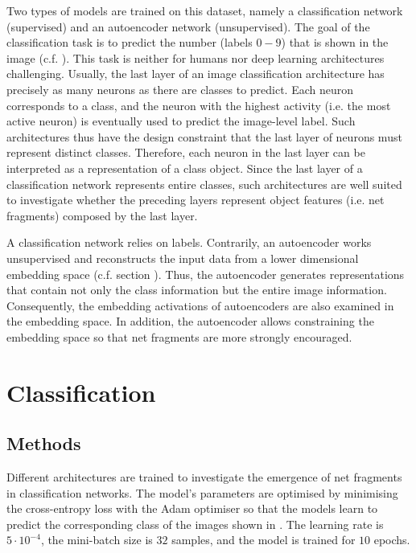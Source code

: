 Two types of models are trained on this dataset, namely a classification network (supervised) and an autoencoder network (unsupervised).
The goal of the classification task is to predict the number (labels $0-9$) that is shown in the image (c.f. ).
This task is neither for humans nor deep learning architectures challenging.
Usually, the last layer of an image classification architecture has precisely as many neurons as there are classes to predict.
Each neuron corresponds to a class, and the neuron with the highest activity (i.e. the most active neuron) is eventually used to predict the image-level label.
Such architectures thus have the design constraint that the last layer of neurons must represent distinct classes.
Therefore, each neuron in the last layer can be interpreted as a representation of a class object.
Since the last layer of a classification network represents entire classes, such architectures are well suited to investigate whether the preceding layers represent object features (i.e. net fragments) composed by the last layer.

A classification network relies on labels.
Contrarily, an autoencoder works unsupervised and reconstructs the input data from a lower dimensional embedding space (c.f. section ).
Thus, the autoencoder generates representations that contain not only the class information but the entire image information.
Consequently, the embedding activations of autoencoders are also examined in the embedding space.
In addition, the autoencoder allows constraining the embedding space so that net fragments are more strongly encouraged.


\section{Classification}

\subsection{Methods}
Different architectures are trained to investigate the emergence of net fragments in classification networks.
The model's parameters are optimised by minimising the cross-entropy loss with the Adam optimiser  so that the models learn to predict the corresponding class of the images shown in .
The learning rate is $5 \cdot 10^{-4}$, the mini-batch size is $32$ samples, and the model is trained for $10$ epochs.

